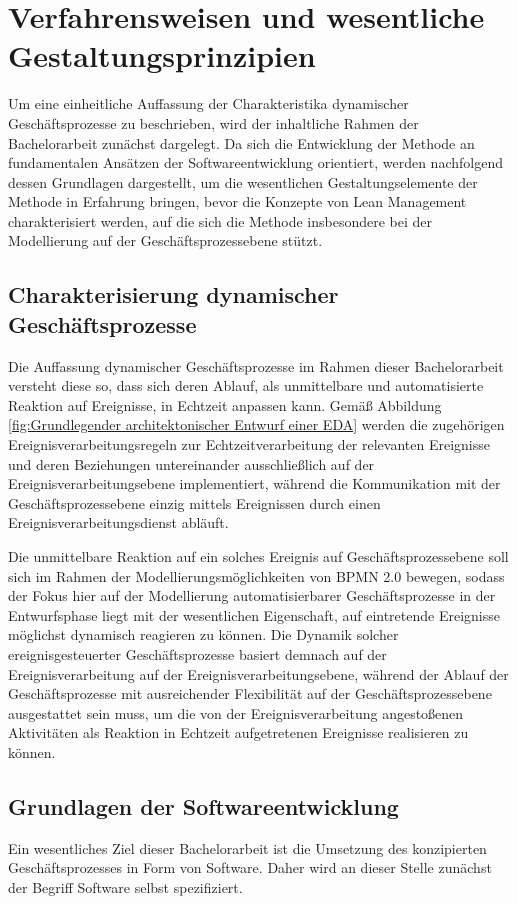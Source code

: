 \section{Verfahrensweisen und wesentliche Gestaltungsprinzipien}\label{sec:methodenGrundlage}
Um eine einheitliche Auffassung der Charakteristika dynamischer Geschäftsprozesse zu beschrieben, wird der inhaltliche Rahmen der Bachelorarbeit zunächst dargelegt.
Da sich die Entwicklung der Methode an fundamentalen Ansätzen der Softwareentwicklung orientiert, werden nachfolgend dessen Grundlagen dargestellt, um die wesentlichen Gestaltungselemente der Methode in Erfahrung bringen, bevor die Konzepte von Lean Management charakterisiert werden, auf die sich die Methode insbesondere bei der Modellierung auf der Geschäftsprozessebene stützt.

\subsection{Charakterisierung dynamischer Geschäftsprozesse}
Die Auffassung dynamischer Geschäftsprozesse im Rahmen dieser Bachelorarbeit versteht diese so, dass sich deren Ablauf, als unmittelbare und automatisierte Reaktion auf Ereignisse, in Echtzeit anpassen kann. Gemäß Abbildung \ref{fig:Grundlegender architektonischer Entwurf einer EDA} werden die zugehörigen Ereignisverarbeitungsregeln zur Echtzeitverarbeitung der relevanten Ereignisse und deren Beziehungen untereinander ausschließlich auf der Ereignisverarbeitungsebene implementiert, während die Kommunikation mit der Geschäftsprozessebene einzig mittels Ereignissen durch einen Ereignisverarbeitungsdienst abläuft.
\cite{Vidackovic.2014}

Die unmittelbare Reaktion auf ein solches Ereignis auf Geschäftsprozessebene soll sich im Rahmen der Modellierungsmöglichkeiten von \ac{BPMN} 2.0 bewegen, sodass der Fokus hier auf der Modellierung automatisierbarer Geschäftsprozesse in der Entwurfsphase liegt mit der wesentlichen Eigenschaft, auf eintretende Ereignisse möglichst dynamisch reagieren zu können. Die Dynamik solcher ereignisgesteuerter Geschäftsprozesse basiert demnach auf der Ereignisverarbeitung auf der Ereignisverarbeitungsebene, während der Ablauf der Geschäftsprozesse mit ausreichender Flexibilität auf der Geschäftsprozessebene ausgestattet sein muss, um die von der Ereignisverarbeitung angestoßenen Aktivitäten als Reaktion in Echtzeit aufgetretenen Ereignisse realisieren zu können.

\subsection{Grundlagen der Softwareentwicklung}
Ein wesentliches Ziel dieser Bachelorarbeit ist die Umsetzung des konzipierten Geschäftsprozesses in Form von Software. Daher wird an dieser Stelle zunächst der Begriff Software selbst spezifiziert.

